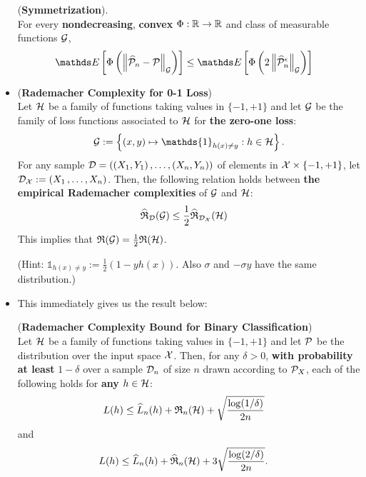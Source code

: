 \documentclass[11pt]{article}
\begin{document}
\begin{itemize}
\begin{remark}
\begin{lemma} (\textbf{Symmetrization}). \citep{wellner2013weak}\\
For every \textbf{nondecreasing}, \textbf{convex} $\Phi: {\mathbb R} \to {\mathbb R}$ and class of measurable functions ${\mathcal G}$,
\begin{align*}
\E{}{\Phi\paren{\norm{\widehat{\cP}_n - \cP}{\cG}}} &\le \E{}{\Phi\paren{2\norm{\widehat{\cP}_n^{\epsilon}}{\cG}}}
\end{align*}
\end{lemma}

\end{remark}

\item \begin{lemma} (\textbf{Rademacher Complexity for 0-1 Loss}) \citep{mohri2018foundations}\\
Let ${\mathcal H}$ be a family of functions taking values in $\{-1, +1\}$ and let ${\mathcal G}$ be the family of loss functions associated to ${\mathcal H}$ for \textbf{the zero-one loss}: 
\begin{align*}
\cG := \set{(x,y) \mapsto \mathds{1}_{h(x) \neq y}:  h \in \cH}.
\end{align*}
For any sample ${\mathcal D} = ((X_1, Y_1) \,{,}\ldots{,}\, (X_n, Y_n))$ of elements in ${\mathcal X} \times \{-1, +1\}$, let ${\mathcal D}_{{\mathcal X}} := (X_1 \,{,}\ldots{,}\, X_n)$. Then, the following relation holds between \textbf{the empirical Rademacher complexities} of ${\mathcal G}$ and ${\mathcal H}$:
\begin{align*}
\widehat{{\mathfrak R}}_{{\mathcal D}}({\mathcal G}) &\le \frac{1}{2}\widehat{{\mathfrak R}}_{{\mathcal D}_{{\mathcal X}}}({\mathcal H})
\end{align*} This implies that ${\mathfrak R}({\mathcal G}) = \frac{1}{2}{\mathfrak R}({\mathcal H})$. 
\end{lemma} (Hint: $ \mathds{1}_{h(x) \neq y} := \frac{1}{2}(1 - y h(x))$. Also $\sigma$ and $-\sigma y$ have the same distribution.)

\item This immediately gives us the result below:
\begin{proposition} \label{prop: generalization_bound_Rademacher} (\textbf{Rademacher Complexity Bound for Binary Classification})\citep{mohri2018foundations}\\
Let ${\mathcal H}$ be a family of functions taking values in $\{-1, +1\}$  and let ${\mathcal P}$ be the distribution over the input space ${\mathcal X}$. Then, for any $\delta > 0$, \textbf{with probability at least} $1 - \delta$ over a sample ${\mathcal D}_{n}$ of size $n$ drawn according to ${\mathcal P}_{X}$, each of the following holds for \textbf{any} $h \in {\mathcal H}$:
\begin{align}
L(h) &\le \widehat{L}_{n}(h) + {\mathfrak R}_{n}({\mathcal H}) + \sqrt{\frac{\log(1 / \delta)}{2n}}  \label{eqn: Rademacher_binary_loss_bound_1}
\end{align} and
\begin{align}
L(h) &\le \widehat{L}_{n}(h) + \widehat{{\mathfrak R}}_{n}({\mathcal H}) +  3\sqrt{\frac{\log(2 / \delta)}{2n}}.  \label{eqn: Rademacher_binary_loss_bound_2}
\end{align}
\end{proposition}


\end{itemize}
\end{document}
